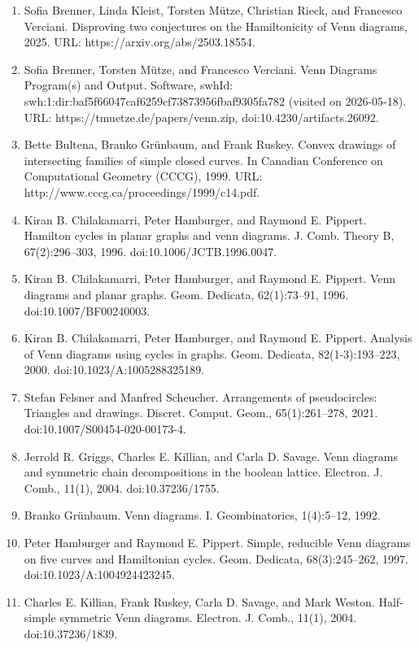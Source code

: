 \documentclass[10pt,a4paper]{article}
\begin{document}
\begin{enumerate}
\item[]  [1]  Sofia Brenner, Linda Kleist, Torsten Mütze, Christian Rieck, and Francesco Verciani.  Disproving two conjectures on the Hamiltonicity of Venn diagrams, 2025.  URL: https://arxiv.org/abs/2503.18554.  
\item[]  [2]  Sofia Brenner, Torsten Mütze, and Francesco Verciani.  Venn Diagrams Program(s) and Output.  Software, swhId: swh:1:dir:baf5f66047caf6259cf73873956fbaf9305fa782 (visited on 2026-05-18).  URL: https://tmuetze.de/papers/venn.zip, doi:10.4230/artifacts.26092.  
\item[]  [3]  Bette Bultena, Branko Grünbaum, and Frank Ruskey.  Convex drawings of intersecting families of simple closed curves.  In Canadian Conference on Computational Geometry (CCCG), 1999.  URL: http://www.cccg.ca/proceedings/1999/c14.pdf.  
\item[]  [4]  Kiran B. Chilakamarri, Peter Hamburger, and Raymond E. Pippert.  Hamilton cycles in planar graphs and venn diagrams.  J. Comb. Theory B, 67(2):296–303, 1996.  doi:10.1006/JCTB.1996.0047.  
\item[]  [5]  Kiran B. Chilakamarri, Peter Hamburger, and Raymond E. Pippert.  Venn diagrams and planar graphs.  Geom. Dedicata, 62(1):73–91, 1996.  doi:10.1007/BF00240003.  
\item[]  [6]  Kiran B. Chilakamarri, Peter Hamburger, and Raymond E. Pippert.  Analysis of Venn diagrams using cycles in graphs.  Geom. Dedicata, 82(1-3):193–223, 2000.  doi:10.1023/A:1005288325189.  
\item[]  [7]  Stefan Felsner and Manfred Scheucher.  Arrangements of pseudocircles: Triangles and drawings.  Discret. Comput. Geom., 65(1):261–278, 2021.  doi:10.1007/S00454-020-00173-4.  
\item[]  [8]  Jerrold R. Griggs, Charles E. Killian, and Carla D. Savage.  Venn diagrams and symmetric chain decompositions in the boolean lattice.  Electron. J. Comb., 11(1), 2004.  doi:10.37236/1755.  
\item[]  [9]  Branko Grünbaum.  Venn diagrams. I.  Geombinatorics, 1(4):5–12, 1992.  
\item[]  [10]  Peter Hamburger and Raymond E. Pippert.  Simple, reducible Venn diagrams on five curves and Hamiltonian cycles.  Geom. Dedicata, 68(3):245–262, 1997.  doi:10.1023/A:1004924423245.  
\item[]  [11]  Charles E. Killian, Frank Ruskey, Carla D. Savage, and Mark Weston.  Half-simple symmetric Venn diagrams.  Electron. J. Comb., 11(1), 2004.  doi:10.37236/1839.  

\end{enumerate}
\end{document}
